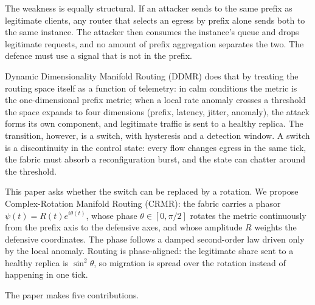 \documentclass[10pt,a4paper]{article}
\begin{document}
The weakness is equally structural. If an attacker sends to the same prefix as
legitimate clients, any router that selects an egress by prefix alone sends both to
the same instance. The attacker then consumes the instance's queue and drops
legitimate requests, and no amount of prefix aggregation separates the two. The
defence must use a signal that is not in the prefix.

Dynamic Dimensionality Manifold Routing (DDMR) does that by treating the routing
space itself as a function of telemetry: in calm conditions the metric is the
one-dimensional prefix metric; when a local rate anomaly crosses a threshold the
space expands to four dimensions (prefix, latency, jitter, anomaly), the attack
forms its own component, and legitimate traffic is sent to a healthy replica. The
transition, however, is a switch, with hysteresis and a detection window. A switch
is a discontinuity in the control state: every flow changes egress in the same
tick, the fabric must absorb a reconfiguration burst, and the state can chatter
around the threshold.

This paper asks whether the switch can be replaced by a rotation. We propose
Complex-Rotation Manifold Routing (CRMR): the fabric carries a phasor
$\psi(t)=R(t)e^{i\theta(t)}$, whose phase $\theta\in[0,\pi/2]$ rotates the metric
continuously from the prefix axis to the defensive axes, and whose amplitude $R$
weights the defensive coordinates. The phase follows a damped second-order law
driven only by the local anomaly. Routing is phase-aligned: the legitimate share
sent to a healthy replica is $\sin^2\theta$, so migration is spread over the
rotation instead of happening in one tick.

The paper makes five contributions.
\end{document}
